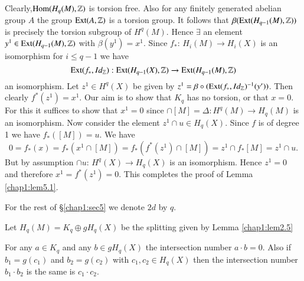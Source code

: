 Clearly,\pageoriginale $\operatorname{Hom}(H_q (M), \mathbb{Z})$ is torsion
free. Also for any 
finitely generated abelian group $A$ the group $\operatorname{Ext}(A, \mathbb{Z})$ is
a torsion group. It follows that $\beta(\operatorname{Ext} (H_{q-1}(M), \mathbb{Z}))$
is precisely the torsion subgroup of $H^q (M)$. Hence $\exists$ an
element $y^1 \in \operatorname{Ext} (H_{q-1} (M), \mathbb{Z})$ with $\beta (y^1)
= x^1$. Since $f_*$: $H_i (M) \to H_i (X)$ is an isomorphism for $i
\leq q-1$ we have
$$
\operatorname{Ext}(f_*, Id_{\mathbb{Z}}): \operatorname{Ext} (H_{q-1}(X),
\mathbb{Z}) \to \operatorname{Ext} (H_{q-1} (M), \mathbb{Z})
$$
an isomorphism. Let $z^1 \in H^q (X)$ be given by $z^1 = \beta \circ
(\operatorname{Ext}(f_*, Id_{\mathbb{Z}})^{-1}(y'))$. Then clearly $f^* (z^1) =
x^1$. Our aim is to show 
that $K_q$ has no torsion, or that $x = 0$. For this it suffices to
show that $x^1 = 0$ since $\cap [M]= \Delta 
: H^q (M) \to H_q (M)$ is an isomorphism. Now consider the element
$z^1 \cap u \in H_q (X)$. Since $f$ is of degree 1 we have $f_*
([M]) = u$. We have  
$$ 
0 = f_* (x) = f_* (x^1 \cap [M]) = f_* (f^* (z^1) \cap [M]) = z^1 \cap 
f_* [M] = z^1 \cap u.  
$$
But by assumption $\cap u$: $H^q (X) \to H_q (X)$ is an
isomorphism. Hence $z^1 = 0$ and therefore $x^1 = f^* (z^1) = 0$. This
completes the proof of Lemma \ref{chap1:lem5.1}. 

For the rest of \S \ref{chap1:sec5} we denote $2d$ by $q$. 

Let $H_q (M)= K_q \oplus gH_q (X)$ be the splitting given by Lemma
\ref{chap1:lem2.5}  

\begin{lemma}\label{chap1:lem5.2}%
For any $a \in K_q$ and any $b \in g H_q (X)$ the
intersection number $a \cdot b = 0$. Also if $b_1 = g(c_1)$ and $b_2 =
g(c_2)$ with $c_1, c_2 \in H_q (X)$ then the intersection
number $b_1 \cdot b_2$ is the same is $c_1 \cdot c_2$. 
\end{lemma}

